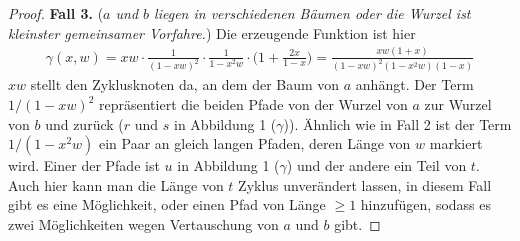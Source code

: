 \documentclass[a4paper, 10pt, ngerman]{article}
\begin{document}
\begin{proof}
    \textbf{Fall 3.} (\emph{$a$ und $b$ liegen in verschiedenen Bäumen oder die Wurzel ist kleinster gemeinsamer Vorfahre.}) Die erzeugende Funktion ist hier
    \begin{align*}
        \gamma(x, w)
        = xw \cdot \frac {1} {(1 - xw)^2} \cdot \frac {1} {1 - x^2w} \cdot \Bigg (1 + \frac {2x}{1 - x} \Bigg )
        = \frac {xw(1 + x)} {(1 - xw)^2(1 - x^2w)(1 - x)}
    \end{align*}
    $xw$ stellt den Zyklusknoten da, an dem der Baum von $a$ anhängt. Der Term $1/(1 - xw)^2$ repräsentiert die beiden Pfade von der Wurzel von $a$ zur Wurzel von $b$ und zurück ($r$ und $s$ in Abbildung 1 ($\gamma$)). Ähnlich wie in Fall 2 ist der Term $1/(1 - x^2w)$ ein Paar an gleich langen Pfaden, deren Länge von $w$ markiert wird. Einer der Pfade ist $u$ in Abbildung 1 ($\gamma$) und der andere ein Teil von $t$. Auch hier kann man die Länge von $t$ Zyklus unverändert lassen, in diesem Fall gibt es eine Möglichkeit, oder einen Pfad von Länge $\ge 1$ hinzufügen, sodass es zwei Möglichkeiten wegen Vertauschung von $a$ und $b$ gibt.


\end{proof}
\end{document}

